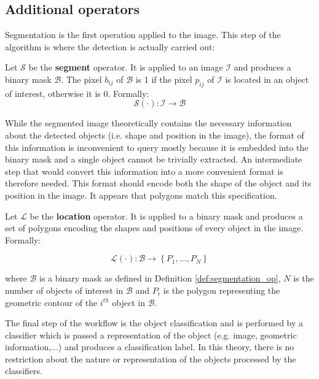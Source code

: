 \subsection{Additional operators}
\label{ssec:other_operators}

Segmentation is the first operation applied to the image. This step of the algorithm is where the detection is actually carried out:
 
\begin{definition} \label{def:segmentation_op}
Let $\mathcal{S}$ be the \textbf{segment} operator. It is applied to an image $\mathcal{I}$ and produces a binary mask $\mathcal{B}$. The pixel $b_{ij}$ of $\mathcal{B}$ is 1 if the pixel $p_{ij}$ of $\mathcal{I}$ is located in an object of interest, otherwise it is 0. Formally:
\begin{equation}
	\label{eqn:operator_segment}
	\mathcal{S}(\cdot) : \mathcal{I} \rightarrow \mathcal{B}
\end{equation}
\end{definition}

While the segmented image theoretically contains the necessary information about the detected objects (i.e. shape and position in the image), the format of this information is inconvenient to query mostly because it is embedded into the binary mask and a single object cannot be trivially extracted. An intermediate step that would convert this information into a more convenient format is therefore needed. This format should encode both the shape of the object and its position in the image. It appears that polygons match this specification. 

\begin{definition} \label{def:locate_op}
Let $\mathcal{L}$ be the \textbf{location} operator. It is applied to a binary mask and produces a set of polygons encoding the shapes and positions of every object in the image. Formally:

\begin{equation}
	\mathcal{L}(\cdot) : \mathcal{B} \rightarrow \left\{P_1, ..., P_N\right\}
\end{equation}

where $\mathcal{B}$ is a binary mask as defined in Definition \ref{def:segmentation_op}, $N$ is the number of objects of interest in $\mathcal{B}$ and $P_i$ is the polygon representing the geometric contour of the $i^{th}$ object in $\mathcal{B}$.
\end{definition}

The final step of the workflow is the object classification and is performed by a classifier which is passed a representation of the object (e.g. image, geometric information,...) and produces a classification label. In this theory, there is no restriction about the nature or representation of the objects processed by the classifiers.

